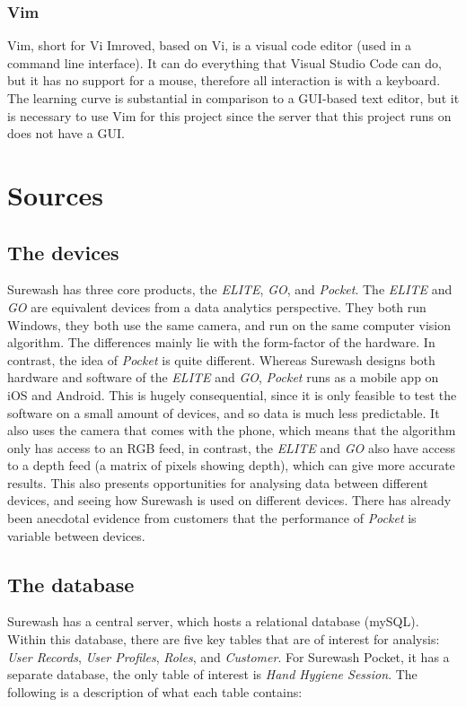         \subsubsection{Vim}
        Vim, short for Vi Imroved, based on Vi, is a visual code editor (used in a command line interface). It can do everything that Visual Studio Code can do, but it has no support for a mouse, therefore all interaction is with a keyboard. The learning curve is substantial in comparison to a GUI-based text editor, but it is necessary to use Vim for this project since the server that this project runs on does not have a GUI.


\section{Sources}
    \subsection{The devices} Surewash has three core products, the {\slshape ELITE}, {\slshape GO}, and {\slshape Pocket}. The {\slshape ELITE} and {\slshape GO} are equivalent devices from a data analytics perspective. They both run Windows, they both use the same camera, and run on the same computer vision algorithm. The differences mainly lie with the form-factor of the hardware. In contrast, the idea of {\slshape Pocket} is quite different. Whereas Surewash designs both hardware and software of the {\slshape ELITE} and {\slshape GO}, {\slshape Pocket} runs as a mobile app on iOS and Android. This is hugely consequential, since it is only feasible to test the software on a small amount of devices, and so data is much less predictable. It also uses the camera that comes with the phone, which means that the algorithm only has access to an RGB feed, in contrast, the {\slshape ELITE} and {\slshape GO} also have access to a depth feed (a matrix of pixels showing depth), which can give more accurate results. This also presents opportunities for analysing data between different devices, and seeing how Surewash is used on different devices. There has already been anecdotal evidence from customers that the performance of {\slshape Pocket} is variable between devices.
    \subsection{The database}
    Surewash has a central server, which hosts a relational database (mySQL). Within this database, there are five key tables that are of interest for analysis: {\slshape User Records}, {\slshape User Profiles}, {\slshape Roles}, and {\slshape Customer}. For Surewash Pocket, it has a separate database, the only table of interest is {\slshape Hand Hygiene Session}. The following is a description of what each table contains:
